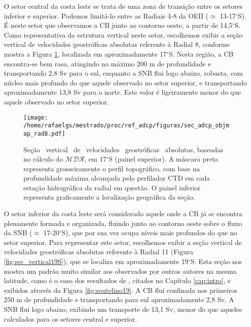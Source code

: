 O setor central da costa leste se trata de uma zona de transição entre os setores inferior e superior. Podemos limitá-lo
entre as Radiais 4-8 da OEII ($\approx$ 13-17$^\circ$S). É neste setor que observamos a CB junto ao contorno oeste, a partir de 
14,5$^\circ$S. Como representativa da estrutura vertical neste setor, escolhemos exibir a seção vertical de 
velocidades geostróficas absolutas referente à Radial 8, conforme mostra a Figura \ref{fig:sec_vertical17S}, 
localizada em aproximadamente 17$^\circ$S. Nesta região, a CB encontra-se bem rasa, atingindo no máximo
200 m de profundidade e transportando 2,8 Sv para o sul, enquanto a SNB flui logo abaixo, robusta, 
com núcleo mais profundo do que aquele observado no setor superior, e transportando aproximadamente 13,8 Sv para o 
norte. Este valor é ligeiramente menor do que aquele observado no setor superior. 

\begin{figure}%
 \begin{center}
  \texttt{[image: /home/rafaelgs/mestrado/proc/ref\_adcp/figuras/sec\_adcp\_objmap\_rad8.pdf]}
 \end{center}
 \vspace{-.5cm}
 \renewcommand{\baselinestretch}{1}
 \caption{\label{fig:sec_vertical17S} \small Seção \  vertical \ de \ velocidades \ geostróficas \ absolutas, baseadas no cálculo do 
$\mathcal{MDR}$, em 17$^\circ$S (painel superior). A máscara preta representa grosseiramente o perfil topográfico, com 
base na profundidade máxima alcançada pelo perfilador CTD em cada estação hidrográfica da radial em questão. O painel
inferior representa graficamente a localização geográfica da seção.}
\end{figure}

O setor inferior da costa leste será considerado aquele onde a CB já se encontra plenamente formada e organizada, fluindo junto
ao contorno oeste sobre o fluxo da SNB ($\approx$ 17-20$^\circ$S), 
que por sua vez ocupa níveis mais profundos do que no setor superior. Para
representar este setor, escolhemos exibir a seção vertical de velocidades geostróficas absolutas
referente à Radial 11 (Figura \ref{fig:sec_vertical19S}), que se localiza em aproximadamente 19$^\circ$S. Esta
seção nos mostra um padrão muito similar aos observados por outros autores na mesma latitude, como é o caso dos
resultados de \cite{soutelino2005}, citados no Capítulo \ref{cap:intro}, e exibidos através
da Figura \ref{fig:soutelino19}. A CB flui confinada nos primeiros 250 m de profundidade e 
transportando para sul aproximadamente 2,8 Sv. A SNB flui logo abaixo, exibindo um transporte de 13,1 Sv, 
 menor do que aqueles calculados para os setores central e superior. 


